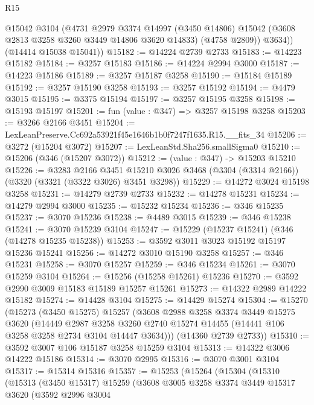 \begin{lexlean}{R15}
\begin{coremodule}
          @15042
          @3104
          (@4731
            @2979
            @3374
            @14997
            (@3450 @14806)
            @15042
            (@3608 @2813 @3258 @3260 @3449 @14806 @3620 @14833)
            (@4758 @2809))
          @3634))
      (@14414 @15038 @15041))
@15182 := @14224 @2739 @2733
@15183 := @14223 @15182
@15184 := @3257 @15183
@15186 := @14224 @2994 @3000
@15187 := @14223 @15186
@15189 := @3257 @15187 @3258
@15190 := @15184 @15189
@15192 := @3257 @15190 @3258
@15193 := @3257 @15192
@15194 := @4479 @3015
@15195 := @3375 @15194
@15197 := @3257 @15195 @3258
@15198 := @15193 @15197
@15201 := fun (value : @347) => @3257 @15198 @3258
@15203 := @3266 @2166 @3451
@15204 := LexLeanPreserve.Cc692a53921f45e1646b1b0f7247f1635.R15.__fits_34
@15206 := @3272 (@15204 @3072)
@15207 := LexLeanStd.Sha256.smallSigma0
@15210 := @15206 (@346 (@15207 @3072))
@15212 := (value : @347) -> @15203 @15210
@15226 := @3283
    @2166
    @3451
    @15210
    @3026
    @3468
    (@3304 (@3314 @2166))
    (@3320 (@3321 (@3322 @3026) @3451 @3298))
@15229 := @14272 @3024 @15198 @3258
@15231 := @14279 @2739 @2733
@15232 := @14278 @15231
@15234 := @14279 @2994 @3000
@15235 := @15232 @15234
@15236 := @346 @15235
@15237 := @3070 @15236
@15238 := @4489 @3015
@15239 := @346 @15238
@15241 := @3070 @15239 @3104
@15247 := @15229 (@15237 @15241) (@346 (@14278 @15235 @15238))
@15253 := @3592 @3011 @3023 @15192 @15197 @15236 @15241
@15256 := @14272 @3010 @15190 @3258
@15257 := @346 @15231
@15258 := @3070 @15257
@15259 := @346 @15234
@15261 := @3070 @15259 @3104
@15264 := @15256 (@15258 @15261) @15236
@15270 := @3592 @2990 @3009 @15183 @15189 @15257 @15261
@15273 := @14322 @2989 @14222 @15182
@15274 := @14428 @3104
@15275 := @14429 @15274
@15304 := @15270
    (@15273
      (@3450 @15275)
      @15257
      (@3608
        @2988
        @3258
        @3374
        @3449
        @15275
        @3620
        (@14449
          @2987
          @3258
          @3260
          @2740
          @15274
          @14455
          (@14441 @106 @3258 @3258 @2734 @3104 @14447 @3634)))
      (@14360 @2739 @2733))
@15310 := @3592 @3007 @106 @15187 @3258 @15259 @3104
@15313 := @14322 @3006 @14222 @15186
@15314 := @3070 @2995
@15316 := @3070 @3001 @3104
@15317 := @15314 @15316
@15357 := @15253
    (@15264
      (@15304
        (@15310
          (@15313
            (@3450 @15317)
            @15259
            (@3608
              @3005
              @3258
              @3374
              @3449
              @15317
              @3620
              (@3592
                @2996
                @3004

\end{coremodule}
\end{lexlean}
